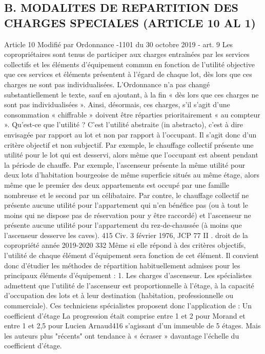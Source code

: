 	\subsection{B. MODALITES DE REPARTITION DES CHARGES SPECIALES (ARTICLE 10 AL 1)}
	
		Article 10 Modifié par Ordonnance -1101 du 30 octobre 2019 - art. 9 Les copropriétaires sont tenus de participer aux charges entraînées par les services collectifs et les éléments d'équipement commun en fonction de l'utilité objective que ces services et éléments présentent à l'égard de chaque lot, dès lors que ces charges ne sont pas individualisées.
		L’Ordonnance n’a pas changé substantiellement le texte, sauf en ajoutant, à la fin « dès lors que ces charges ne sont pas individualisées ». Ainsi, désormais, ces charges, s’il s’agit d’une consommation « chiffrable » doivent être réparties prioritairement « au compteur ».
		Qu'est-ce que l'utilité ? C'est l'utilité abstraite (in abstracto), c'est à dire envisagée par rapport au lot et non par rapport à l'occupant. Il s'agit donc d'un critère objectif et non subjectif.
		Par exemple, le chauffage collectif présente une utilité pour le lot qui est desservi, alors même que l'occupant est absent pendant la période de chauffe.
		Par exemple, l'ascenseur présente la même utilité pour deux lots d’habitation bourgeoise de même superficie situés au même étage, alors même que le premier des deux appartements est occupé par une famille nombreuse et le second par un célibataire.
		Par contre, le chauffage collectif ne présente aucune utilité pour l'appartement qui n'en bénéfice pas (ou à tout le moins qui ne dispose pas de réservation pour y être raccordé) et l'ascenseur ne présente aucune utilité pour l'appartement du rez-de-chaussée (à moins que l’ascenseur desserve les caves).
		415 Civ. 3 février 1976, JCP 77 II .
		droit de la copropriété année 2019-2020
		332
		Même si elle répond à des critères objectifs, l'utilité de chaque élément d'équipement sera fonction de cet élément. Il convient donc d'étudier les méthodes de répartition habituellement admises pour les principaux éléments d'équipement :
		1. Les charges d'ascenseur.
		Les spécialistes admettent que l'utilité de l'ascenseur est proportionnelle à l'étage, à la capacité d'occupation des lots et à leur destination (habitation, professionnelle ou commerciale).
		Ces techniciens spécialistes proposent donc l'application de :
		Un coefficient d'étage
		La progression était comprise entre 1 et 2 pour Morand et entre 1 et 2,5 pour Lucien Arnaud416 s'agissant d'un immeuble de 5 étages. Mais les auteurs plus "récents" ont tendance à « écraser » davantage l'échelle du coefficient d'étage.
